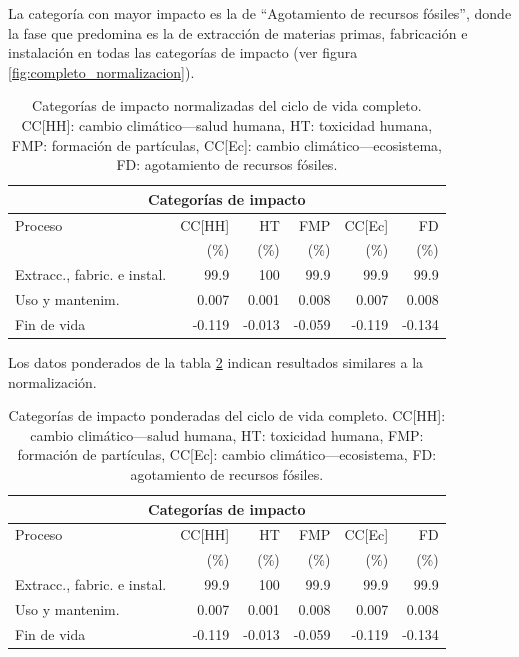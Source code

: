 La categoría con mayor impacto es la de ``Agotamiento de recursos fósiles'', donde la fase que predomina es la de extracción de materias primas, fabricación e instalación en todas las categorías de impacto (ver figura \ref{fig:completo_normalizacion}).

\begin{table}[!htb]
\centering
\begin{tabular}{p{4cm}rrrrr}
\toprule
\multicolumn{6}{c}{Categorías de impacto}\\
\midrule
Proceso & CC[HH] & HT & FMP & CC[Ec] & FD\\
 &  (\%) & (\%) & (\%) & (\%) & (\%)\\
\midrule
Extracc., fabric. e instal. & 99.9 & 100 & 99.9 & 99.9 & 99.9\\
Uso y mantenim. & 0.007 & 0.001 & 0.008 & 0.007 & 0.008\\
Fin de vida & -0.119 & -0.013 & -0.059 & -0.119 & -0.134\\
\bottomrule
\end{tabular}
\caption[Categorías de impacto normalizadas del ciclo de vida completo..]{Categorías de impacto normalizadas del ciclo de vida completo. CC[HH]: cambio climático—salud humana, HT: toxicidad humana, FMP: formación de partículas, CC[Ec]: cambio climático—ecosistema, FD: agotamiento de recursos fósiles.}
\label{categoriasimpactocompleto}
\end{table}

Los datos ponderados de la tabla \ref{categoriasimpactocompletoponderados} indican resultados similares a la normalización.

\begin{table}[!htb]
\centering
\begin{tabular}{p{4cm}rrrrr}
\toprule
\multicolumn{6}{c}{Categorías de impacto}\\
\midrule
Proceso & CC[HH] & HT & FMP & CC[Ec] & FD\\
 &  (\%) & (\%) & (\%) & (\%) & (\%)\\
\midrule
Extracc., fabric. e instal. & 99.9 & 100 & 99.9 & 99.9 & 99.9\\
Uso y mantenim. & 0.007 & 0.001 & 0.008 & 0.007 & 0.008\\
Fin de vida & -0.119 & -0.013 & -0.059 & -0.119 & -0.134\\
\bottomrule
\end{tabular}
\caption[Categorías de impacto ponderadas del ciclo de vida completo..]{Categorías de impacto ponderadas del ciclo de vida completo. CC[HH]: cambio climático—salud humana, HT: toxicidad humana, FMP: formación de partículas, CC[Ec]: cambio climático—ecosistema, FD: agotamiento de recursos fósiles.}
\label{categoriasimpactocompletoponderados}
\end{table}

